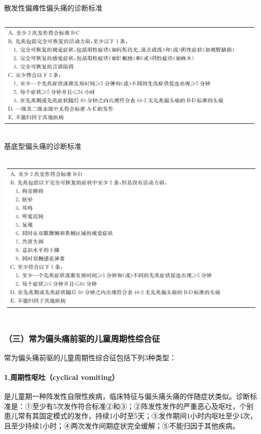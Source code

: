 \begin{table}[htbp]
\centering
\caption{散发性偏瘫性偏头痛的诊断标准}
\label{tab46-8}
\includegraphics[width=5.89583in,height=2.33333in]{./images/Image00284.jpg}
\end{table}

\begin{table}[htbp]
\centering
\caption{基底型偏头痛的诊断标准}
\label{tab46-9}
\includegraphics[width=5.91667in,height=3.34375in]{./images/Image00285.jpg}
\end{table}

\subsubsection{（三）常为偏头痛前驱的儿童周期性综合征}

常为偏头痛前驱的儿童周期性综合征包括下列3种类型：

\paragraph{1.周期性呕吐（cyclical vomiting）}

是儿童期一种阵发性自限性疾病，临床特征与偏头痛头痛的伴随症状类似。诊断标准是：①至少有5次发作符合标准②和③；②阵发性发作的严重恶心及呕吐，个别患儿常有其固定模式的发作，持续1小时至5天；③发作期间1小时内呕吐至少4次，且至少持续1小时；④两次发作间期症状完全缓解；⑤不能归因于其他疾病。

